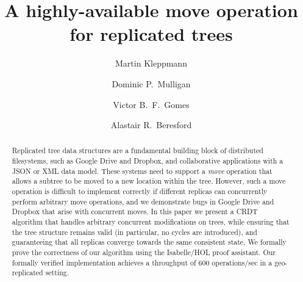 \documentclass[sigplan,anonymous]{acmart}
\begin{document}
\title{A highly-available move operation for replicated trees}

\author{Martin Kleppmann}

\author{Dominic P.\ Mulligan}

\author{Victor B.\ F.\ Gomes}

\author{Alastair R.\ Beresford}


\begin{abstract}
    Replicated tree data structures are a fundamental building block of distributed filesystems, such as Google Drive and Dropbox, and collaborative applications with a JSON or XML data model.
    These systems need to support a \emph{move} operation that allows a subtree to be moved to a new location within the tree.
    However, such a move operation is difficult to implement correctly if different replicas can concurrently perform arbitrary move operations, and we demonstrate bugs in Google Drive and Dropbox that arise with concurrent moves.
    In this paper we present a CRDT algorithm that handles arbitrary concurrent modifications on trees, while ensuring that the tree structure remains valid (in particular, no cycles are introduced), and guaranteeing that all replicas converge towards the same consistent state.
    We formally prove the correctness of our algorithm using the Isabelle/HOL proof assistant.
    Our formally verified implementation achieves a throughput of 600 operations/sec in a geo-replicated setting.
\end{abstract}
\end{document}
